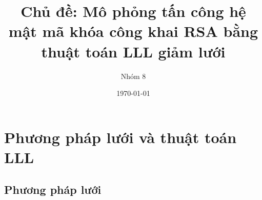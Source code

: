 \documentclass{beamer}
\title[{\makebox[.15\paperwidth]{MI4100 - Mật mã và độ phức tạp thuật toán}}]{Chủ đề: Mô phỏng tấn công hệ mật mã khóa công khai RSA bằng thuật toán LLL giảm lưới}
\author[Nhóm 8]{Nhóm 8}
\date[\today]{\today}
\numberwithin{equation}{section}
\begin{document}
\section{Phương pháp lưới và thuật toán LLL}
\subsection{Phương pháp lưới}





\end{document}
